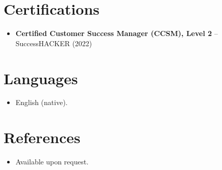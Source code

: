\documentclass[11pt,a4paper,sans]{moderncv}
\begin{document}

\section{Certifications}
\vspace{1pt}
\begin{itemize}
\item{\textbf{Certified Customer Success Manager (CCSM), Level 2} -- SuccessHACKER (2022)}
\end{itemize}


\section{Languages}
\vspace{1pt}
\begin{itemize}
\item English (native).
\end{itemize}


\section{References}
\vspace{1pt}
\begin{itemize}
\item{Available upon request.}
\end{itemize}
\end{document}
